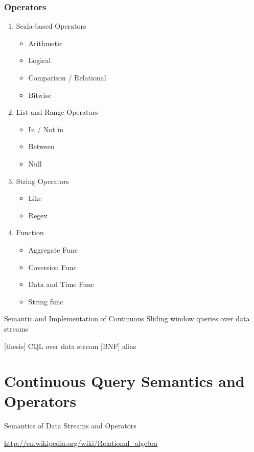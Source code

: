 \subsubsection{Operators}
\begin{enumerate}

\item Scala-based Operators
	\begin{itemize}
        \item Arithmetic
        \item Logical
        \item Comparison / Relational
        \item Bitwise
	\end{itemize}
	
 \item List and Range Operators
 	\begin{itemize}
        \item In / Not in
        \item Between
        \item Null
 	\end{itemize}
 \item String Operators
 	\begin{itemize}
        \item Like
        \item Regex
 	\end{itemize}
 \item Function 
 	\begin{itemize}
        \item Aggregate Func
        \item Coversion Func
       	\item Data and Time Func
        \item String func
 	\end{itemize}

\end{enumerate}
Semantic and Implementation of Continuous Sliding window queries over data streams

[thesis] CQL over data stream [BNF] alias



\section{Continuous Query Semantics and Operators} \label{semantic}
Semantics of Data Streams and Operators

\href{http://en.wikipedia.org/wiki/Relational\_algebra}{http://en.wikipedia.org/wiki/Relational\_algebra}

